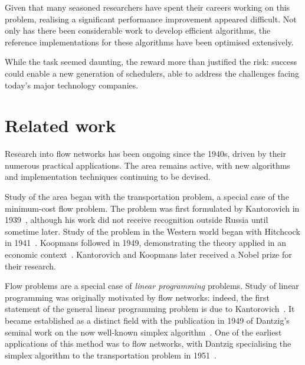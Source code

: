 Given that many seasoned researchers have spent their careers working on this problem, realising a significant performance improvement appeared difficult. Not only has there been considerable work to develop efficient algorithms, the reference implementations for these algorithms have been optimised extensively.

While the task seemed daunting, the reward more than justified the risk: success could enable a new generation of schedulers, able to address the challenges facing today's major technology companies.

\section{Related work} \label{sec:intro-related-work}


Research into flow networks has been ongoing since the 1940s, driven by their numerous practical applications. The area remains active, with new algorithms and implementation techniques continuing to be devised.

Study of the area began with the transportation problem, a special case of the minimum-cost flow problem. The problem was first formulated by Kantorovich in 1939~\cite{Kantorovich:1960}, although his work did not receive recognition outside Russia until sometime later. Study of the problem in the Western world began with Hitchcock in 1941~\cite{Hitchcock:1941}. Koopmans followed in 1949, demonstrating the theory applied in an economic context~\cite{Koopmans:1949}. Kantorovich and Koopmans later received a Nobel prize for their research\footnotemark.

Flow problems are a special case of \emph{linear programming} problems. Study of linear programming was originally motivated by flow networks: indeed, the first statement of the general linear programming problem is due to Kantorovich~\cite{Kantorovich:1960}. It became established as a distinct field with the publication in 1949 of Dantzig's seminal work on the now well-known simplex algorithm~\cite{Dantzig:1949}. One of the earliest applications of this method was to flow networks, with Dantzig specialising the simplex algorithm to the transportation problem in 1951~\cite{Dantzig:1951}.

